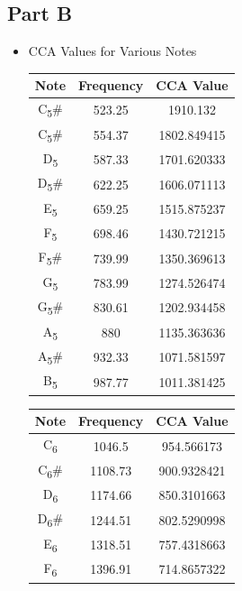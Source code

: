 \documentclass[letterpaper, 12pt]{article}
\begin{document}
\subsection*{Part B}
\begin{itemize}
  \item CCA Values for Various Notes
    \begin{center}
      \begin{tabular}{| c | c | c |}
        \hline
        Note & Frequency & CCA Value \\
        \hline\hline
        C\textsubscript{5}\# & 523.25 & 1910.132 \\
        \hline
				C\textsubscript{5}\# & 554.37 & 1802.849415 \\
        \hline
				D\textsubscript{5} & 587.33 & 1701.620333 \\
        \hline
				D\textsubscript{5}\# & 622.25 & 1606.071113 \\
        \hline
				E\textsubscript{5} & 659.25 & 1515.875237 \\
        \hline
				F\textsubscript{5} & 698.46 & 1430.721215 \\
        \hline
				F\textsubscript{5}\# & 739.99 & 1350.369613 \\
        \hline
				G\textsubscript{5} & 783.99 & 1274.526474 \\
        \hline
				G\textsubscript{5}\# & 830.61 & 1202.934458 \\
        \hline
				A\textsubscript{5} & 880 & 1135.363636 \\
        \hline
				A\textsubscript{5}\# & 932.33 & 1071.581597 \\
        \hline
				B\textsubscript{5} & 987.77 & 1011.381425 \\
        \hline
      \end{tabular}
      \begin{tabular}{| c | c | c |}
        \hline
        Note & Frequency & CCA Value \\
        \hline\hline
				C\textsubscript{6} & 1046.5 & 954.566173 \\
				\hline
				C\textsubscript{6}\# & 1108.73 & 900.9328421 \\
				\hline
				D\textsubscript{6} & 1174.66 & 850.3101663 \\
				\hline
				D\textsubscript{6}\# & 1244.51 & 802.5290998 \\
				\hline
				E\textsubscript{6} & 1318.51 & 757.4318663 \\
				\hline
				F\textsubscript{6} & 1396.91 & 714.8657322 \\

\end{tabular}
\end{center}
\end{itemize}
\end{document}
